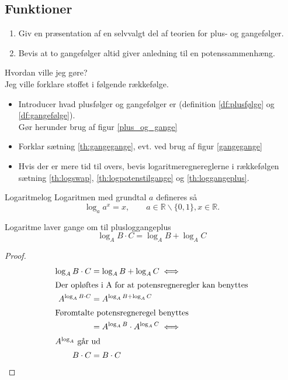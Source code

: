 \documentclass{article}
\begin{document}
\begin{tcolorbox}
	\section{Funktioner}
	\tcblower
	\begin{enumerate}
		\item Giv en præsentation af en selvvalgt del af teorien for plus- og gangefølger.
		\item Bevis at to gangefølger altid giver anledning til en potenssammenhæng.
	\end{enumerate}
\end{tcolorbox}

\begin{eksempel*}{Hvordan ville jeg gøre?}{}\\
	Jeg ville forklare stoffet i følgende rækkefølge.
	\begin{itemize}
		\item Introducer hvad plusfølger og gangefølger er 
			(definition \ref{df:plusfølge} og \ref{df:gangefølge}).\\
			Gør herunder brug af figur \ref{plus_og_gange} %
		\item Forklar sætning \ref{th:gangegange}, evt. ved brug af figur \ref{gangegange}
		\item Hvis der er mere tid til overs, bevis logaritmeregnereglerne i rækkefølgen
			sætning \ref{th:logswap}, \ref{th:logpotenstilgange} og \ref{th:loggangeplus}.
	\end{itemize}
\end{eksempel*}

\begin{definition}{Logaritme}{log}
	Logaritmen med grundtal $a$ defineres så
	\[
		\log_a{a^x} = x,\qquad a \in \mathbb{R}\backslash\{0, 1\}, x\in\mathbb{R}.
	\] 
\end{definition}

\begin{theorem}{Logaritme laver gange om til plus}{loggangeplus}
	\[\log_A{B \cdot C} = \log_AB + \log_AC\]
\end{theorem}

\begin{proof}
\begin{align*}
	\log_A{B \cdot C} &= \log_AB + \log_AC \iff\\
\intertext{Der opløftes i A for at potensregneregler kan benyttes}
	A^{\log_A{B \cdot C}} &= A^{\log_AB + \log_AC}\\
\intertext{Føromtalte potensregneregel benyttes}
						  &= A^{\log_AB} \cdot A^{\log_AC} \iff\\
\intertext{$A^{\log_A}$ går ud}
	B \cdot C &= B \cdot C\qedhere
\end{align*}
\end{proof}
\end{document}
